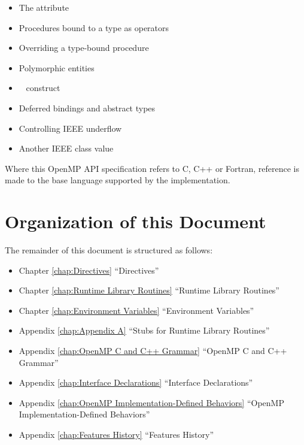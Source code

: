 \begin{itemize}
\begin{itemize}
\item The  attribute

\item Procedures bound to a type as operators

\item Overriding a type-bound procedure

\item Polymorphic entities

\item {}~ construct

\item Deferred bindings and abstract types

\item Controlling IEEE underflow

\item Another IEEE class value 
\end{itemize}
\end{itemize}

Where this OpenMP API specification refers to C, C++ or Fortran, reference is made to 
the base language supported by the implementation.








\pagebreak
\section{Organization of this Document}
\label{sec:Organization of this document}
The remainder of this document is structured as follows: 

\begin{itemize}
\item Chapter \ref{chap:Directives} ``Directives''

\item Chapter \ref{chap:Runtime Library Routines} ``Runtime Library Routines''

\item Chapter \ref{chap:Environment Variables} ``Environment Variables''

\item Appendix \ref{chap:Appendix A} ``Stubs for Runtime Library Routines''

\item Appendix \ref{chap:OpenMP C and C++ Grammar} ``OpenMP C and C++ Grammar''

\item Appendix \ref{chap:Interface Declarations} ``Interface Declarations'' 

\item Appendix \ref{chap:OpenMP Implementation-Defined Behaviors} ``OpenMP Implementation-Defined Behaviors''

\item Appendix \ref{chap:Features History} ``Features History''
\end{itemize}

